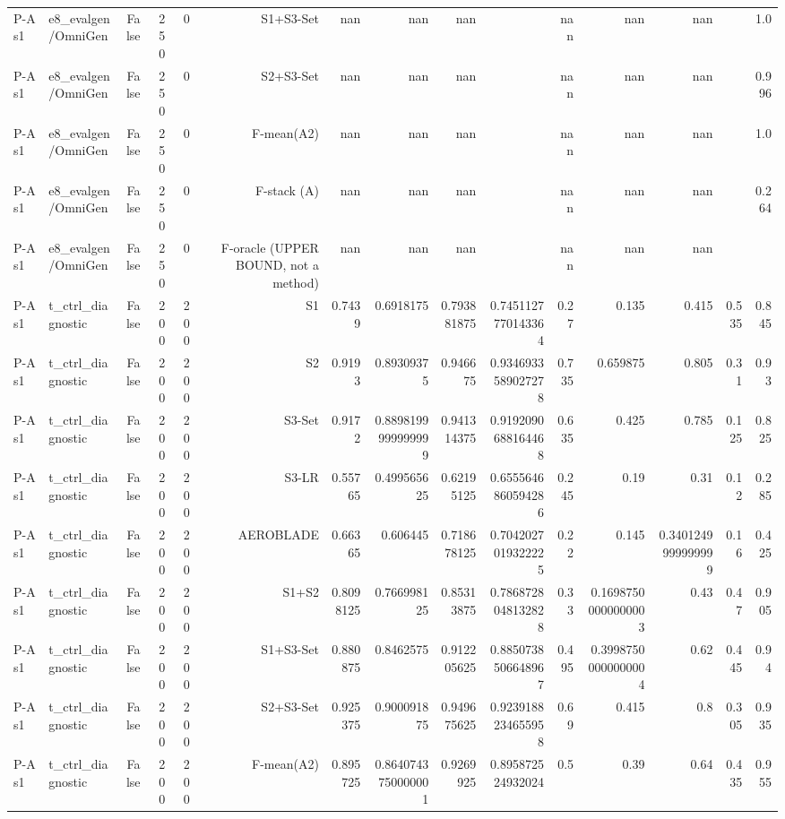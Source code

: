 \begin{table}[htbp]
\begin{tabular}{llrrrrrrrrrrrrr}
P-A s1 & e8\_evalgen/OmniGen & False & 250 & 0 & S1+S3-Set & nan & nan & nan &  & nan & nan & nan &  & 1.0 \\
P-A s1 & e8\_evalgen/OmniGen & False & 250 & 0 & S2+S3-Set & nan & nan & nan &  & nan & nan & nan &  & 0.996 \\
P-A s1 & e8\_evalgen/OmniGen & False & 250 & 0 & F-mean(A2) & nan & nan & nan &  & nan & nan & nan &  & 1.0 \\
P-A s1 & e8\_evalgen/OmniGen & False & 250 & 0 & F-stack (A) & nan & nan & nan &  & nan & nan & nan &  & 0.264 \\
P-A s1 & e8\_evalgen/OmniGen & False & 250 & 0 & F-oracle (UPPER BOUND, not a method) & nan & nan & nan &  & nan & nan & nan &  &  \\
P-A s1 & t\_ctrl\_diagnostic & False & 200 & 200 & S1 & 0.7439 & 0.6918175 & 0.793881875 & 0.7451127770143364 & 0.27 & 0.135 & 0.415 & 0.535 & 0.845 \\
P-A s1 & t\_ctrl\_diagnostic & False & 200 & 200 & S2 & 0.9193 & 0.89309375 & 0.946675 & 0.9346933589027278 & 0.735 & 0.659875 & 0.805 & 0.31 & 0.93 \\
P-A s1 & t\_ctrl\_diagnostic & False & 200 & 200 & S3-Set & 0.9172 & 0.8898199999999999 & 0.941314375 & 0.9192090688164468 & 0.635 & 0.425 & 0.785 & 0.125 & 0.825 \\
P-A s1 & t\_ctrl\_diagnostic & False & 200 & 200 & S3-LR & 0.55765 & 0.499565625 & 0.62195125 & 0.6555646860594286 & 0.245 & 0.19 & 0.31 & 0.12 & 0.285 \\
P-A s1 & t\_ctrl\_diagnostic & False & 200 & 200 & AEROBLADE & 0.66365 & 0.606445 & 0.718678125 & 0.7042027019322225 & 0.22 & 0.145 & 0.3401249999999999 & 0.16 & 0.425 \\
P-A s1 & t\_ctrl\_diagnostic & False & 200 & 200 & S1+S2 & 0.8098125 & 0.766998125 & 0.85313875 & 0.7868728048132828 & 0.33 & 0.16987500000000003 & 0.43 & 0.47 & 0.905 \\
P-A s1 & t\_ctrl\_diagnostic & False & 200 & 200 & S1+S3-Set & 0.880875 & 0.8462575 & 0.912205625 & 0.8850738506648967 & 0.495 & 0.39987500000000004 & 0.62 & 0.445 & 0.94 \\
P-A s1 & t\_ctrl\_diagnostic & False & 200 & 200 & S2+S3-Set & 0.925375 & 0.900091875 & 0.949675625 & 0.9239188234655958 & 0.69 & 0.415 & 0.8 & 0.305 & 0.935 \\
P-A s1 & t\_ctrl\_diagnostic & False & 200 & 200 & F-mean(A2) & 0.895725 & 0.8640743750000001 & 0.9269925 & 0.895872524932024 & 0.5 & 0.39 & 0.64 & 0.435 & 0.955 \\

\end{tabular}
\end{table}
